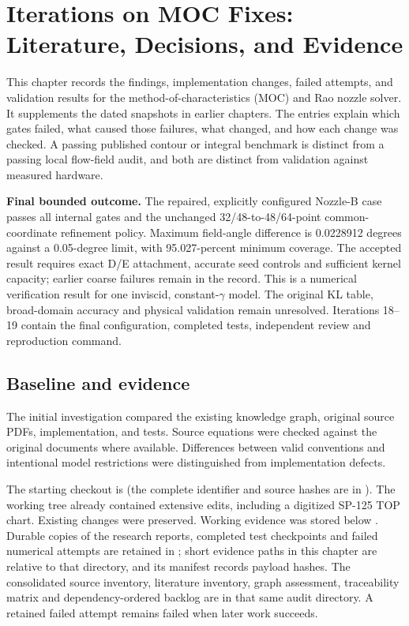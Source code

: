 \chapter[Iterations on MOC Fixes: Literature, Decisions, and Evidence]{Iterations on MOC Fixes:\\Literature, Decisions, and Evidence}
\label{ch:moc-iterations}

This chapter records the findings, implementation changes, failed attempts,
and validation results for the method-of-characteristics (MOC) and Rao
nozzle solver. It supplements the dated snapshots in earlier chapters.
The entries explain which gates failed, what caused those failures, what
changed, and how each change was checked. A passing published contour or
integral benchmark is distinct from a passing local flow-field audit, and
both are distinct from validation against measured hardware.

\textbf{Final bounded outcome.} The repaired, explicitly configured Nozzle-B
case passes all internal gates and the unchanged 32/48-to-48/64-point
common-coordinate refinement policy. Maximum field-angle difference is
0.0228912 degrees against a 0.05-degree limit, with 95.027-percent minimum
coverage. The accepted result requires exact D/E attachment, accurate seed
controls and sufficient kernel capacity; earlier coarse failures remain in
the record. This is a numerical verification result for one inviscid,
constant-$\gamma$ model. The original KL table, broad-domain accuracy and
physical validation remain unresolved. Iterations 18--19 contain the final
configuration, completed tests, independent review and reproduction command.

\section{Baseline and evidence}
The initial investigation compared the existing knowledge graph, original
source PDFs, implementation, and tests. Source equations were checked
against the original documents where available. Differences between valid
conventions and intentional model restrictions were distinguished from
implementation defects.

The starting checkout is  (the complete identifier and source hashes
are in ). The working
tree already contained extensive edits, including a digitized SP-125 TOP
chart. Existing changes were preserved. Working evidence was stored below
. Durable copies of the research reports,
completed test checkpoints and failed numerical attempts are retained in
;
short evidence paths in this chapter are relative to that directory, and
its manifest records payload hashes. The consolidated source inventory,
literature inventory, graph assessment, traceability matrix and dependency-ordered
backlog are in that same audit directory. A retained failed attempt remains
failed when later work succeeds.

